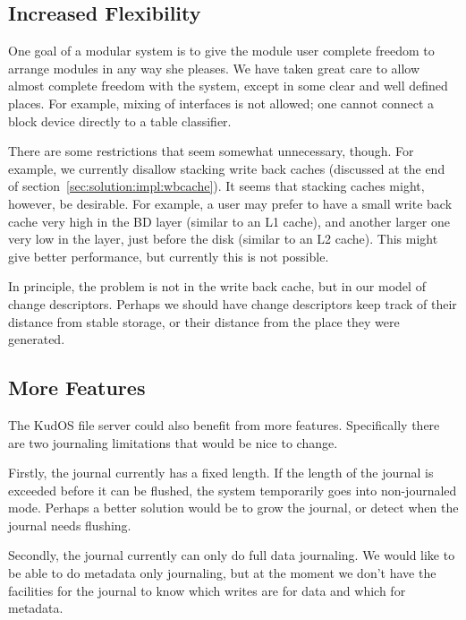 \subsection{Increased Flexibility}
\label{sec:future:flexibility}

One goal of a modular system is to give the module user complete freedom to
arrange modules in any way she pleases. We have taken great care to allow almost
complete freedom with the system, except in some clear and well defined places.
For example, mixing of interfaces is not allowed; one cannot connect a block
device directly to a table classifier.

There are some restrictions that seem somewhat unnecessary, though. For example,
we currently disallow stacking write back caches (discussed at the end of
section~\ref{sec:solution:impl:wbcache}). It seems that stacking caches might,
however, be desirable. For example, a user may prefer to have a small write back
cache very high in the BD layer (similar to an L1 cache), and another larger one
very low in the layer, just before the disk (similar to an L2 cache). This might
give better performance, but currently this is not possible.

In principle, the problem is not in the write back cache, but in our model of
change descriptors. Perhaps we should have change descriptors keep track of
their distance from stable storage, or their distance from the place they were
generated.

\subsection{More Features}
\label{sec:future:features}

The KudOS file server could also benefit from more features. Specifically there
are two journaling limitations that would be nice to change.

Firstly, the journal currently has a fixed length. If the length of the journal
is exceeded before it can be flushed, the system temporarily goes into non-journaled mode.
Perhaps a better solution would be to grow the journal, or detect when the
journal needs flushing.

Secondly, the journal currently can only do full data journaling. We would like
to be able to do metadata only journaling, but at the moment we don't have the
facilities for the journal to know which writes are for data and which for
metadata.
